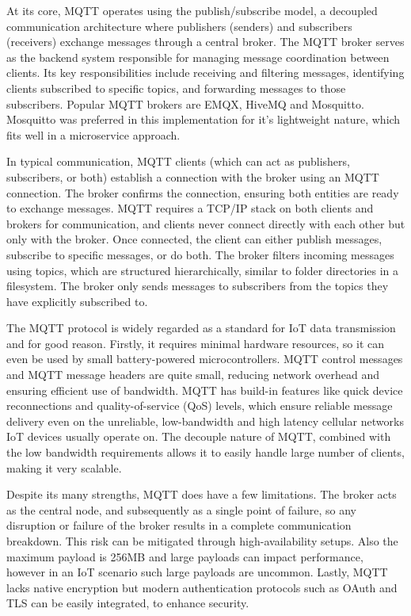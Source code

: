 At its core, MQTT operates using the publish/subscribe model, a decoupled communication architecture where publishers (senders) and subscribers (receivers) exchange messages through a central broker. The MQTT broker serves as the backend system responsible for managing message coordination between clients. Its key responsibilities include receiving and filtering messages, identifying clients subscribed to specific topics, and forwarding messages to those subscribers. Popular MQTT brokers are EMQX, HiveMQ and Mosquitto. Mosquitto was preferred in this implementation for it's lightweight nature, which fits well in a microservice approach.

In typical communication, MQTT clients (which can act as publishers, subscribers, or both) establish a connection with the broker using an MQTT connection. The broker confirms the connection, ensuring both entities are ready to exchange messages. MQTT requires a TCP/IP stack on both clients and brokers for communication, and clients never connect directly with each other but only with the broker. Once connected, the client can either publish messages, subscribe to specific messages, or do both. The broker filters incoming messages using topics, which are structured hierarchically, similar to folder directories in a filesystem. The broker only sends messages to subscribers from the topics they have explicitly subscribed to.

The MQTT protocol is widely regarded as a standard for IoT data transmission and for good reason. Firstly, it requires minimal hardware resources, so it can even be used by small battery-powered microcontrollers. MQTT control messages and MQTT message headers are quite small, reducing network overhead and ensuring efficient use of bandwidth. MQTT has build-in features like quick device reconnections and quality-of-service (QoS) levels, which ensure reliable message delivery even on the unreliable, low-bandwidth and high latency cellular networks IoT devices usually operate on. The decouple nature of MQTT, combined with the low bandwidth requirements allows it to easily handle large number of clients, making it very scalable. 

Despite its many strengths, MQTT does have a few limitations. The broker acts as the central node, and subsequently as a single point of failure, so any disruption or failure of the broker results in a complete communication breakdown. This risk can be mitigated through high-availability setups. Also the maximum payload is 256MB and large payloads can impact performance, however in an IoT scenario such large payloads are uncommon. Lastly, MQTT lacks native encryption but modern authentication protocols such as OAuth and TLS can be easily integrated, to enhance security\cite{mqtt}.

